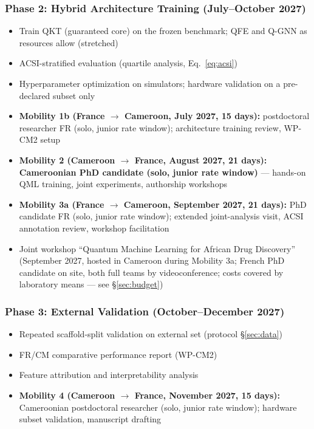 \documentclass[11pt,a4paper]{article}
\begin{document}
\subsubsection{Phase 2: Hybrid Architecture Training (July--October 2027)}
\begin{itemize}
    \item Train QKT (guaranteed core) on the frozen benchmark; QFE and Q-GNN as resources allow (stretched)
    \item ACSI-stratified evaluation (quartile analysis, Eq.\ \ref{eq:acsi})
    \item Hyperparameter optimization on simulators; hardware validation on a pre-declared subset only
    \item \textbf{Mobility 1b (France $\rightarrow$ Cameroon, July 2027, 15 days):} postdoctoral researcher FR (solo, junior rate window); architecture training review, WP-CM2 setup
    \item \textbf{Mobility 2 (Cameroon $\rightarrow$ France, August 2027, 21 days):} \textbf{Cameroonian PhD candidate (solo, junior rate window)} --- hands-on QML training, joint experiments, authorship workshops
    \item \textbf{Mobility 3a (France $\rightarrow$ Cameroon, September 2027, 21 days):} PhD candidate FR (solo, junior rate window); extended joint-analysis visit, ACSI annotation review, workshop facilitation
    \item Joint workshop ``Quantum Machine Learning for African Drug Discovery'' (September 2027, hosted in Cameroon during Mobility 3a; French PhD candidate on site, both full teams by videoconference; costs covered by laboratory means --- see \S\ref{sec:budget})
\end{itemize}

\subsubsection{Phase 3: External Validation (October--December 2027)}
\begin{itemize}
    \item Repeated scaffold-split validation on external set (protocol \S\ref{sec:data})
    \item FR/CM comparative performance report (WP-CM2)
    \item Feature attribution and interpretability analysis
    \item \textbf{Mobility 4 (Cameroon $\rightarrow$ France, November 2027, 15 days):} Cameroonian postdoctoral researcher (solo, junior rate window); hardware subset validation, manuscript drafting
\end{itemize}
\end{document}
